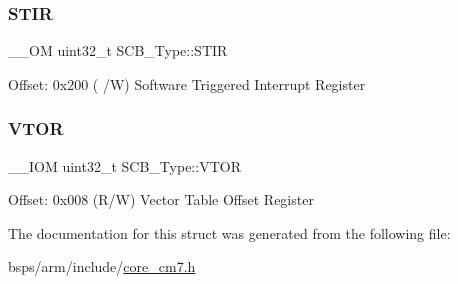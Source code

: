 \subsubsection{\texorpdfstring{STIR}{STIR}}
{\footnotesize\ttfamily \+\_\+\+\_\+\+OM uint32\+\_\+t S\+C\+B\+\_\+\+Type\+::\+S\+T\+IR}

Offset\+: 0x200 ( /W) Software Triggered Interrupt Register \mbox{\label{structSCB__Type_a187a4578e920544ed967f98020fb8170}} 
\subsubsection{\texorpdfstring{VTOR}{VTOR}}
{\footnotesize\ttfamily \+\_\+\+\_\+\+I\+OM uint32\+\_\+t S\+C\+B\+\_\+\+Type\+::\+V\+T\+OR}

Offset\+: 0x008 (R/W) Vector Table Offset Register 

The documentation for this struct was generated from the following file\+:\begin{DoxyCompactItemize}
\item 
bsps/arm/include/\mbox{\hyperlink{core__cm7_8h}{core\+\_\+cm7.\+h}}\end{DoxyCompactItemize}
